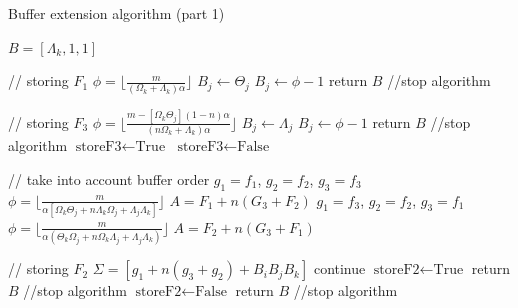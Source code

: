 \documentclass[conference]{IEEEtran}
\begin{document}
\begin{algorithm}[h]
  \caption{Buffer extension algorithm (part 1)}

  \begin{algorithmic}
    \STATE $B = [\Lambda_k, 1, 1]$

    \STATE // storing $F_1$
    \STATE $ \phi = \lfloor \frac{m}{(\Omega_k + \Lambda_k)\alpha} \rfloor $
      \STATE $B_j \leftarrow \Theta_j$
    \ELSE
      \STATE $B_j \leftarrow \phi - 1$
      \STATE return $B$ //stop algorithm
    \ENDIF

    \STATE // storing $F_3$
    \STATE $ \phi = \lfloor \frac{m - [\Omega_k \Theta_j](1-n)\alpha}{(n\Omega_k + \Lambda_k)\alpha} \rfloor $
      \STATE $B_j \leftarrow \Lambda_j$
    \ELSE
      \STATE $B_j \leftarrow \phi - 1$
      \STATE return $B$ //stop algorithm
    \ENDIF
      \STATE $\textrm{storeF3} \leftarrow \textrm{True}$
    \ELSE
      \STATE $\textrm{storeF3} \leftarrow \textrm{False}$
    \ENDIF

    \STATE // take into account buffer order
      \STATE $g_1 = f_1$, $g_2 = f_2$, $g_3 = f_3$
      \STATE $\phi = \lfloor \frac{m}{\alpha[\Omega_k \Theta_j + n \Lambda_k \Omega_j + \Lambda_j \Lambda_k]} \rfloor$
      \STATE $A = F_1 + n(G_3 + F_2)$
    \ELSE
      \STATE $g_1 = f_3$, $g_2 = f_2$, $g_3 = f_1$
      \STATE $\phi = \lfloor \frac{m}{\alpha (\Theta_k \Omega_j + n\Omega_k\Lambda_j + \Lambda_j \Lambda_k)} \rfloor$
      \STATE $A = F_2 + n(G_3 + F_1)$
    \ENDIF

    \STATE // storing $F_2$
    \STATE $\Sigma = [g_1 + n(g_3 + g_2) + B_iB_jB_k]$
      \STATE continue
      \STATE $\textrm{storeF2} \leftarrow \textrm{True}$
      \STATE return $B$ //stop algorithm
    \ELSE
      \STATE $\textrm{storeF2} \leftarrow \textrm{False}$
      \STATE return $B$ //stop algorithm
    \ENDIF

  \end{algorithmic}
  \label{algo:buffer_extension_1}
\end{algorithm}
\end{document}
